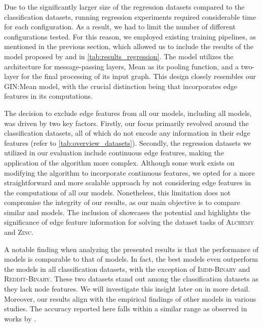 Due to the significantly larger size of the regression datasets compared to the classification datasets, running regression experiments required considerable time for each configuration. As a result, we had to limit the number of different configurations tested. For this reason, we employed existing training pipelines, as mentioned in the previous section, which allowed us to include the results of the \gineeps model proposed by \cite{Mor+2020} and \cite{Morris2022} in \cref{tab:results_regression}.
The \gineeps model utilizes the \gin architecture for message-passing layers, \textsf{Mean} as its pooling function, and a two-layer \mlp for the final processing of its input graph. This design closely resembles our \textsf{GIN:Mean} model, with the crucial distinction being that \gineeps incorporates edge features in its computations.

The decision to exclude edge features from all our models, including all \wlnn models, was driven by two key factors. Firstly, our focus primarily revolved around the classification datasets, all of which do not encode any information in their edge features (refer to \cref{tab:overview_datasets}). Secondly, the regression datasets we utilized in our evaluation include continuous edge features, making the application of the \wl algorithm more complex. Although some work exists on modifying the \wl algorithm to incorporate continuous features, we opted for a more straightforward and more scalable approach by not considering edge features in the computations of all our models. Nonetheless, this limitation does not compromise the integrity of our results, as our main objective is to compare similar \gnn and \wlnn models. The inclusion of \gineeps showcases the potential and highlights the significance of edge feature information for solving the dataset tasks of \textsc{Alchemy} and \textsc{Zinc}.

A notable finding when analyzing the presented results is that the performance of \wlnn models is comparable to that of \gnn models. In fact, the best \wlnn models even outperform the \gnn models in all classification datasets, with the exception of \textsc{Imdb-Binary} and \textsc{Reddit-Binary}. These two datasets stand out among the classification datasets as they lack node features. We will investigate this insight later on in more detail. 
Moreover, our results align with the empirical findings of other \gnn models in various studies. The accuracy reported here falls within a similar range as observed in works by \cite{Xu2018,Morris2022,Mor+2020,Zhang2018}. 

